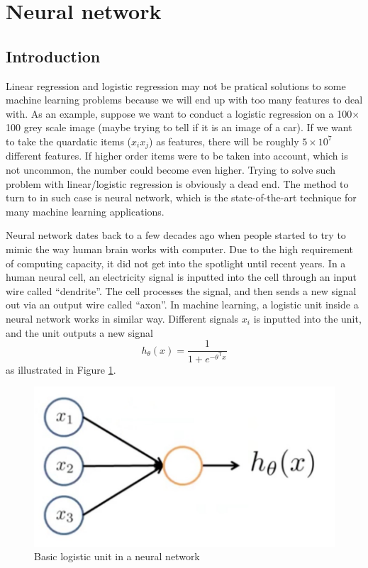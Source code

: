 \ifx\PREAMBLE\undefined


\fi
\section{Neural network}
\subsection{Introduction}
Linear regression and logistic regression may not be pratical solutions to some machine learning problems because we will end up with too many features to deal with. As an example, suppose we want to conduct a logistic regression on a 100$\times$100 grey scale image (maybe trying to tell if it is an image of a car). If we want to take the quardatic items ($x_ix_j$) as features, there will be roughly $5\times10^7$ different features. If higher order items were to be taken into account, which is not uncommon, the number could become even higher. Trying to solve such problem with linear/logistic regression is obviously a dead end. The method to turn to in such case is neural network, which is the state-of-the-art technique for many machine learning applications.

Neural network dates back to a few decades ago when people started to try to mimic the way human brain works with computer. Due to the high requirement of computing capacity, it did not get into the spotlight until recent years. In a human neural cell, an electricity signal is inputted into the cell through an input wire called ``dendrite''. The cell processes the signal, and then sends a new signal out via an output wire called ``axon''. In machine learning, a logistic unit inside a neural network works in similar way. Different signals $x_i$ is inputted into the unit, and the unit outputs a new signal
\begin{equation} 
h_{\theta}(x) = \frac{1}{1+e^{-\theta^{\mathsf T}x}}
\end{equation}
as illustrated in Figure \ref{neuralunit}.
\begin{figure}[ht]
\centering
\includegraphics[width =0.6 \textwidth]{neuralunit.jpg}
\caption{Basic logistic unit in a neural network}\label{neuralunit}
\end{figure}

